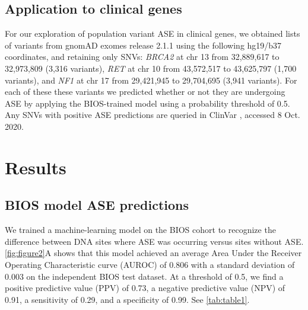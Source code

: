 \documentclass{book}
\begin{document}
\begin{refsection}
\subsection*{Application to clinical genes}
For our exploration of population variant ASE in clinical genes, we obtained lists of variants from gnomAD exomes release 2.1.1 \cite{Karczewski2020The} using the following hg19/b37 coordinates, and retaining only SNVs: \textit{BRCA2} at chr 13 from 32,889,617 to 32,973,809 (3,316 variants), \textit{RET} at chr 10 from 43,572,517 to 43,625,797 (1,700 variants), and \textit{NF1} at chr 17 from 29,421,945 to 29,704,695 (3,941 variants).
For each of these these variants we predicted whether or not they are undergoing ASE by applying the BIOS-trained model using a probability threshold of 0.5.
Any SNVs with positive ASE predictions are queried in ClinVar \cite{Landrum2013ClinVar}, accessed 8 Oct. 2020.

\section*{Results}
\subsection*{BIOS model ASE predictions}
We trained a machine-learning model on the BIOS cohort to recognize the difference between DNA sites where ASE was occurring versus sites without ASE.
\ref{fig:figure2}A shows that this model achieved an average Area Under the Receiver Operating Characteristic curve (AUROC) of 0.806 with a standard deviation of 0.003 on the independent BIOS test dataset.
At a threshold of 0.5, we find a positive predictive value (PPV) of 0.73, a negative predictive value (NPV) of 0.91, a sensitivity of 0.29, and a specificity of 0.99. See \ref{tab:table1}.


\end{refsection}
\end{document}
